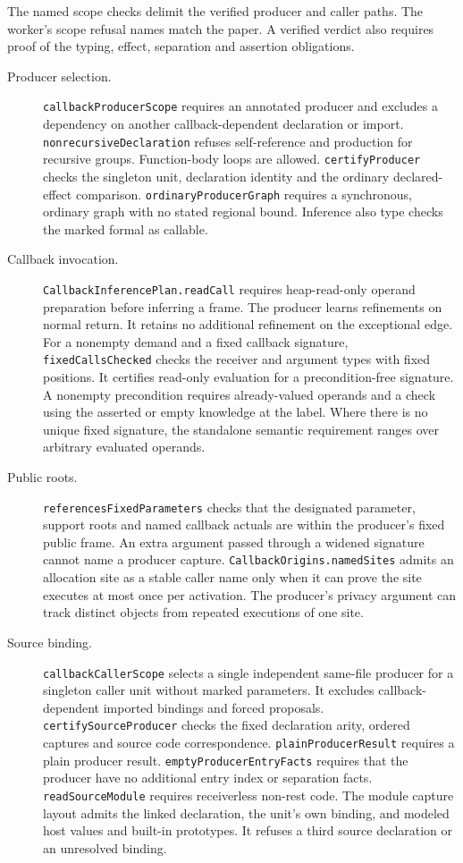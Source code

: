\documentclass[10pt,a4paper]{article}
\theoremstyle{definition}
\newcommand{\lean}[1]{\textcolor{leanc}{\texttt{\small #1}}}
\newcommand{\scopecheck}[1]{\lean{#1}}
\begin{document}
The named scope checks delimit the verified producer and caller paths.
The worker's scope refusal names match the paper. A verified verdict
also requires proof of the typing, effect, separation and assertion
obligations.

\begin{description}
\item[Producer selection.] \scopecheck{callbackProducerScope}
requires an annotated producer and excludes a dependency on another
callback-dependent declaration or import. \scopecheck{nonrecursiveDeclaration}
refuses self-reference and production for recursive groups. Function-body
loops are allowed. \lean{certifyProducer} checks the singleton unit,
declaration identity and the ordinary declared-effect comparison.
\scopecheck{ordinaryProducerGraph} requires a synchronous,
ordinary graph with no stated regional bound. Inference also type checks
the marked formal as callable.

\item[Callback invocation.] \lean{CallbackInferencePlan.readCall}
requires heap-read-only operand preparation before inferring a frame.
The producer learns refinements on normal return. It retains no
additional refinement on the exceptional edge. For a nonempty demand
and a fixed callback signature, \lean{fixedCallsChecked} checks the
receiver and argument types with fixed positions. It certifies read-only
evaluation for a precondition-free signature. A nonempty precondition
requires already-valued operands and a check using the asserted or empty
knowledge at the label. Where there is no unique fixed signature, the
standalone semantic requirement ranges over arbitrary evaluated operands.

\item[Public roots.] \scopecheck{referencesFixedParameters} checks
that the designated parameter, support roots and named callback actuals
are within the producer's fixed public frame. An extra argument passed
through a widened signature cannot name a producer capture.
\lean{CallbackOrigins.namedSites} admits an allocation site as a stable
caller name only when it can prove the site executes at most once per
activation. The producer's privacy argument can track distinct objects
from repeated executions of one site.

\item[Source binding.] \scopecheck{callbackCallerScope} selects a
single independent same-file producer for a singleton caller unit
without marked parameters. It excludes callback-dependent imported bindings and forced proposals.
\lean{certifySourceProducer} checks the fixed declaration arity,
ordered captures and source code correspondence.
\scopecheck{plainProducerResult} requires a plain producer result.
\scopecheck{emptyProducerEntryFacts} requires that the producer have
no additional entry index or separation facts.
\scopecheck{readSourceModule} requires receiverless non-rest code.
The module capture layout admits the linked declaration, the unit's own
binding, and modeled host values and built-in prototypes. It refuses a
third source declaration or an unresolved binding.


\end{description}
\end{document}
